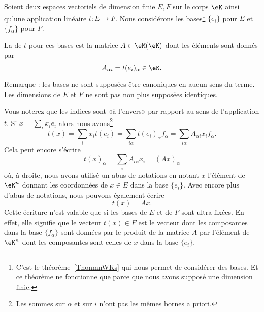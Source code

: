 \begin{definition}      \label{DEFooSNDJooXODUgR}
    Soient deux espaces vectoriels de dimension finie \( E,F\) sur le corps \( \eK\) ainsi qu'une application linéaire \( t\colon E\to F\). Nous considérons les bases\footnote{C'est le théorème~\ref{ThonmnWKs} qui nous permet de considérer des bases. Et ce théorème ne fonctionne que parce que nous avons supposé une dimension finie.} \( \{ e_i \}\) pour \( E\) et \( \{ f_{\alpha} \}\) pour \( F\). 

    La  de \( t\) pour ces bases est la matrice \( A\in \eM(\eK)\) dont les éléments sont donnés par
    \begin{equation}
        A_{\alpha i}=t(e_i)_{\alpha}\in \eK.
    \end{equation}
\end{definition}

Remarque : les bases ne sont supposées être canoniques en aucun sens du terme. Les dimensions de \( E\) et \( F\) ne sont pas non plus supposées identiques.

\begin{normaltext}
    Vous noterez que les indices sont «à l'envers» par rapport au sens de l'application \( t\). Si \( x=\sum_ix_ie_i\) alors nous avons\footnote{Les sommes sur \( \alpha\) et sur \( i\) n'ont pas les mêmes bornes a priori.}
    \begin{equation}
        t(x)=\sum_ix_it(e_i)=\sum_{i\alpha}t(e_i)_{\alpha}f_{\alpha}=\sum_{i\alpha}A_{\alpha i}x_if_{\alpha}.
    \end{equation}
    Cela peut encore s'écrire
    \begin{equation}
        t(x)_{\alpha}=\sum_iA_{\alpha i}x_i=(Ax)_{\alpha}
    \end{equation}
    où, à droite, nous avons utilisé un abus de notations en notant \( x\) l'élément de \( \eK^n\) donnant les coordonnées de \( x\in E\) dans la base \( \{ e_i \}\). Avec encore plus d'abus de notations, nous pouvons également écrire
    \begin{equation}
        t(x)=Ax.
    \end{equation}
    Cette écriture n'est valable que si les bases de \( E\) et de \( F\) sont ultra-fixées. En effet, elle signifie que le vecteur \( t(x)\in F\) est le vecteur dont les composantes dans la base \( \{ f_{\alpha} \}\) sont données par le produit de la matrice \( A\) par l'élément de \( \eK^n\) dont les composantes sont celles de \( x\) dans la base \( \{ e_i \}\).
\end{normaltext}

